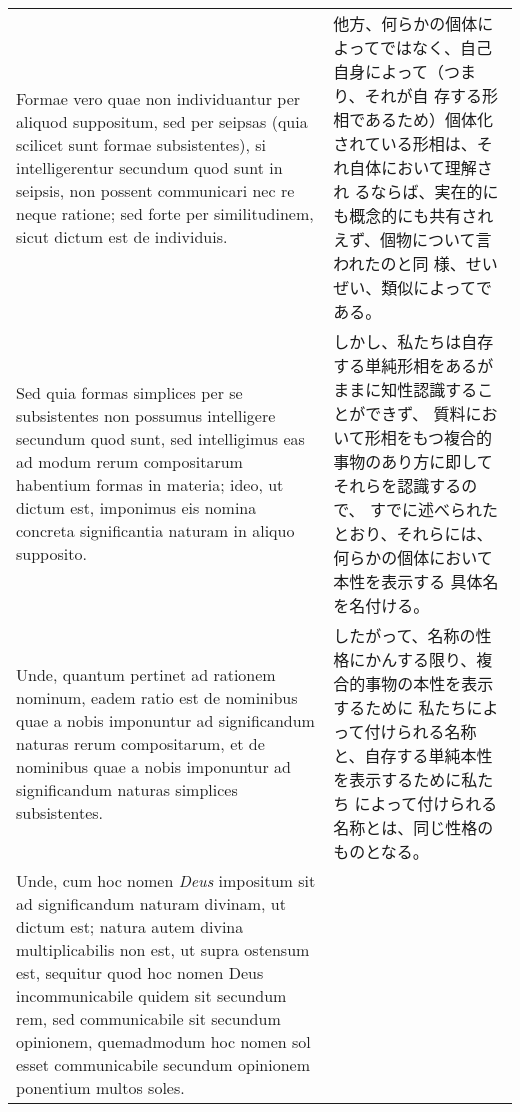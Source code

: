 \documentclass[10pt]{jsarticle}
\begin{document}
\begin{longtable}{p{21em}p{21em}}
\\

Formae vero quae non individuantur per aliquod suppositum, sed per
seipsas (quia scilicet sunt formae subsistentes), si intelligerentur
secundum quod sunt in seipsis, non possent communicari nec re neque
ratione; sed forte per similitudinem, sicut dictum est de individuis.

&

他方、何らかの個体によってではなく、自己自身によって（つまり、それが自
存する形相であるため）個体化されている形相は、それ自体において理解され
るならば、実在的にも概念的にも共有されえず、個物について言われたのと同
様、せいぜい、類似によってである。

\\

Sed quia formas simplices per se subsistentes non possumus intelligere
secundum quod sunt, sed intelligimus eas ad modum rerum compositarum
habentium formas in materia; ideo, ut dictum est, imponimus eis nomina
concreta significantia naturam in aliquo supposito.

&

しかし、私たちは自存する単純形相をあるがままに知性認識することができず、
質料において形相をもつ複合的事物のあり方に即してそれらを認識するので、
すでに述べられたとおり、それらには、何らかの個体において本性を表示する
具体名を名付ける。

\\

Unde, quantum pertinet ad rationem nominum, eadem ratio est de
nominibus quae a nobis imponuntur ad significandum naturas rerum
compositarum, et de nominibus quae a nobis imponuntur ad significandum
naturas simplices subsistentes.

&

したがって、名称の性格にかんする限り、複合的事物の本性を表示するために
私たちによって付けられる名称と、自存する単純本性を表示するために私たち
によって付けられる名称とは、同じ性格のものとなる。

\\

Unde, cum hoc nomen {\itshape Deus} impositum sit ad significandum
naturam divinam, ut dictum est; natura autem divina multiplicabilis
non est, ut supra ostensum est, sequitur quod hoc nomen Deus
incommunicabile quidem sit secundum rem, sed communicabile sit
secundum opinionem, quemadmodum hoc nomen sol esset communicabile
secundum opinionem ponentium multos soles.

&


\end{longtable}
\end{document}
